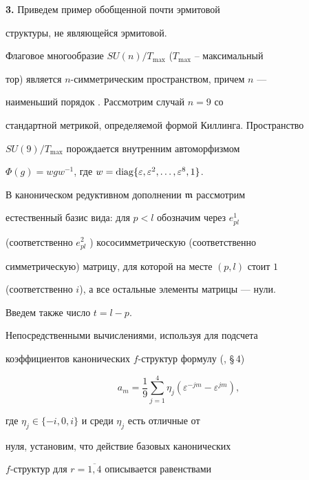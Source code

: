 {\bf 3.} Приведем пример обобщенной почти эрмитовой


структуры, не являющейся эрмитовой.





Флаговое многообразие $SU(n)/T_{\max}$ ($T_{\max}$ -- максимальный


тор) является $n$-симметрическим пространством, причем $n$ ---


наименьший порядок \cite{Jim}. Рассмотрим случай $n=9$ со


стандартной метрикой, определяемой формой Киллинга. Пространство


$SU(9)/T_{\max}$ порождается внутренним автоморфизмом


$\Phi(g)=wgw^{-1}$, где $w=\diag\{\varepsilon, \varepsilon^2, \dotsc,


\varepsilon^8, 1\}$.





В каноническом редуктивном дополнении $\frak{m}$ рассмотрим


естественный базис вида: для $p<l$ обозначим через $e^1_{pl}$


(соответственно $e^2_{pl}$ ) кососимметрическую (соответственно


симметрическую) матрицу, для которой на месте $(p, l)$ стоит $1$


(соответственно $i$), а все остальные элементы матрицы --- нули.


Введем также число $t=l-p$.





Непосредственными вычислениями, используя для подсчета


коэффициентов канонических $f$-структур формулу (\cite{13}, \S\,4)


$$


a_m=\frac{1}{9}\sum_{j=1}^4\eta_j(\varepsilon^{-jm}-\varepsilon^{jm}),


$$


где $\eta_j\in \{-i, 0, i\}$ и среди $\eta_j$ есть отличные от


нуля, установим, что действие базовых канонических


$f$-структур для $r=\overline{1,4}$ описывается равенствами


